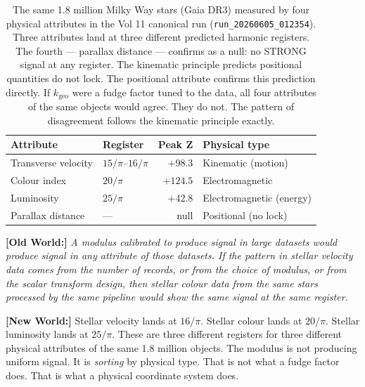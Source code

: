 \documentclass[11pt, letterpaper, openany]{book}
\newcommand{\oldworld}[1]{\noindent\textbf{\color{goldseal}[Old World:]}
  \textit{#1}\medskip}
\newcommand{\newworld}[1]{\noindent\textbf{\color{kishblue}[New World:]}
  #1\medskip}
\begin{document}
\begin{table}[H]
\centering
\renewcommand{\arraystretch}{1.4}
\small
\begin{tabular}{|l|l|r|l|}
\hline
\rowcolor{kishblue!10}
\textbf{Attribute} & \textbf{Register} & \textbf{Peak Z} & \textbf{Physical type} \\
\hline\hline
Transverse velocity & $15/\pi$--$16/\pi$ & $+98.3$ & Kinematic (motion) \\
Colour index & $20/\pi$ & $+124.5$ & Electromagnetic \\
Luminosity & $25/\pi$ & $+42.8$ & Electromagnetic (energy) \\
Parallax distance & --- & null & Positional (no lock) \\
\hline
\end{tabular}
\caption{The same 1.8 million Milky Way stars (Gaia DR3) measured by
four physical attributes in the Vol 11 canonical run
(\texttt{run\_20260605\_012354}). Three attributes land at three
different predicted harmonic registers. The fourth --- parallax
distance --- confirms as a null: no STRONG signal at any register.
The kinematic principle predicts positional quantities do not lock.
The positional attribute confirms this prediction directly.
If $k_\text{geo}$ were a fudge factor tuned to the data, all four
attributes of the same objects would agree. They do not.
The pattern of disagreement follows the kinematic principle exactly.}
\end{table}

\oldworld{A modulus calibrated to produce signal in large datasets
would produce signal in any attribute of those datasets. If the
pattern in stellar velocity data comes from the number of records,
or from the choice of modulus, or from the scalar transform design,
then stellar colour data from the same stars processed by the same
pipeline would show the same signal at the same register.}

\newworld{Stellar velocity lands at $16/\pi$. Stellar colour lands
at $20/\pi$. Stellar luminosity lands at $25/\pi$. These are three
different registers for three different physical attributes of the
same 1.8 million objects. The modulus is not producing uniform
signal. It is \textit{sorting} by physical type. That is not what
a fudge factor does. That is what a physical coordinate system does.}

\clearpage
\end{document}
